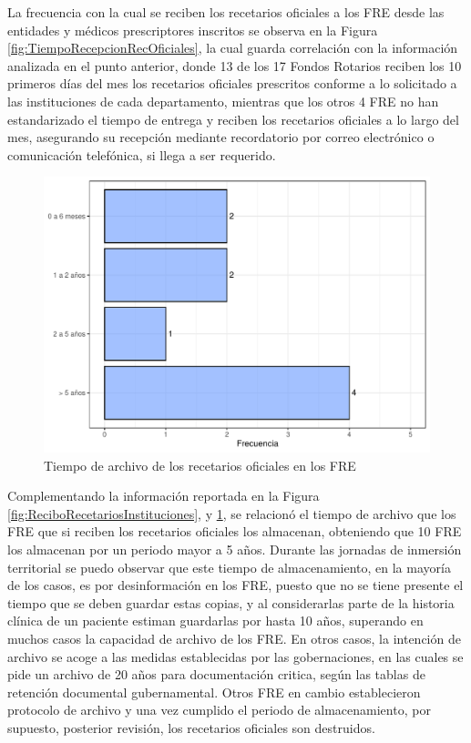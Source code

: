 \documentclass[
]{book}
\begin{document}
La frecuencia con la cual se reciben los recetarios oficiales a los FRE desde las entidades y médicos prescriptores inscritos se observa en la Figura \ref{fig:TiempoRecepcionRecOficiales}, la cual guarda correlación con la información analizada en el punto anterior, donde 13 de los 17 Fondos Rotarios reciben los 10 primeros días del mes los recetarios oficiales prescritos conforme a lo solicitado a las instituciones de cada departamento, mientras que los otros 4 FRE no han estandarizado el tiempo de entrega y reciben los recetarios oficiales a lo largo del mes, asegurando su recepción mediante recordatorio por correo electrónico o comunicación telefónica, si llega a ser requerido.

\begin{figure}
\includegraphics[width=0.85\linewidth]{InformeFinal_files/figure-latex/TiempoArchivoRecetariosOficiales-1} \caption{Tiempo de archivo de los recetarios oficiales en los FRE}\label{fig:TiempoArchivoRecetariosOficiales}
\end{figure}

Complementando la información reportada en la Figura \ref{fig:ReciboRecetariosInstituciones}, y \ref{fig:TiempoArchivoRecetariosOficiales}, se relacionó el tiempo de archivo que los FRE que si reciben los recetarios oficiales los almacenan, obteniendo que 10 FRE los almacenan por un periodo mayor a 5 años. Durante las jornadas de inmersión territorial se puedo observar que este tiempo de almacenamiento, en la mayoría de los casos, es por desinformación en los FRE, puesto que no se tiene presente el tiempo que se deben guardar estas copias, y al considerarlas parte de la historia clínica de un paciente estiman guardarlas por hasta 10 años, superando en muchos casos la capacidad de archivo de los FRE. En otros casos, la intención de archivo se acoge a las medidas establecidas por las gobernaciones, en las cuales se pide un archivo de 20 años para documentación critica, según las tablas de retención documental gubernamental. Otros FRE en cambio establecieron protocolo de archivo y una vez cumplido el periodo de almacenamiento, por supuesto, posterior revisión, los recetarios oficiales son destruidos.
\end{document}
